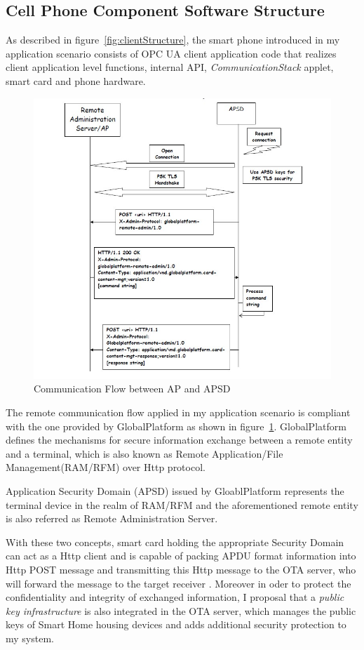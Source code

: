 \subsection{Cell Phone Component Software Structure}
As described in figure~\ref{fig:clientStructure}, the smart phone introduced in my application scenario consists of OPC UA client application code that realizes client application level functions, internal API, \emph{CommunicationStack} applet, smart card and phone hardware.

\begin{figure}[!htb]
	\centering
	\includegraphics[width=1.2\textwidth]{apsd.jpg}
		\caption{Communication Flow between AP and APSD \cite{ramGP}}
	\label{fig:apsd}
\end{figure}
The remote communication flow applied in my application scenario is compliant with the one provided by GlobalPlatform as shown in figure~\ref{fig:apsd}. GlobalPlatform defines the mechanisms for secure information exchange between a remote entity and a terminal, which is also known as Remote Application/File Management(RAM/RFM) over Http protocol. 

Application Security Domain (APSD) issued by GloablPlatform represents the terminal device in the realm of RAM/RFM and the aforementioned remote entity  is also referred as Remote Administration Server. 

With these two concepts, smart card holding the appropriate Security Domain can act as a Http client and is capable of packing APDU format information into Http POST message and transmitting this Http message to the OTA server, who will forward the message to the target receiver \cite{ramGP}. Moreover in oder to protect the confidentiality and integrity of exchanged information, I proposal that a \emph{public key infrastructure} is also integrated in the OTA server, which manages the public keys of Smart Home housing devices and adds additional security protection to my system.
 
